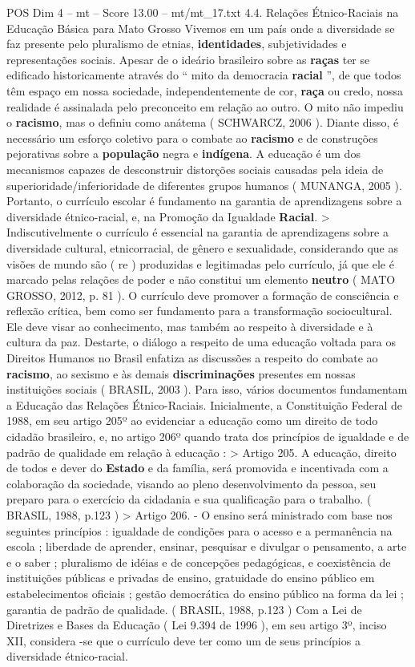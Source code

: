 \begin{textsample}{POS Dim 4 – mt – Score 13.00 – mt/mt\_17.txt}  \label{ex:f4_pos_174}
4.4.
Relações Étnico-Raciais na Educação Básica para Mato Grosso Vivemos em um país onde a diversidade se faz presente pelo pluralismo de etnias, \textbf{identidades}, subjetividades e representações sociais.
Apesar de o ideário brasileiro sobre as \textbf{raças} ter se edificado historicamente através do “ mito da democracia \textbf{racial} ”, de que todos têm espaço em nossa sociedade, independentemente de cor, \textbf{raça} ou credo, nossa realidade é assinalada pelo preconceito em relação ao outro.
O mito não impediu o \textbf{racismo}, mas o definiu como anátema ( SCHWARCZ, 2006 ).
Diante disso, é necessário um esforço coletivo para o combate ao \textbf{racismo} e de construções pejorativas sobre a \textbf{população} negra e \textbf{indígena}.
A educação é um dos mecanismos capazes de desconstruir distorções sociais causadas pela ideia de superioridade/inferioridade de diferentes grupos humanos ( MUNANGA, 2005 ).
Portanto, o currículo escolar é fundamento na garantia de aprendizagens sobre a diversidade étnico-racial, e, na Promoção da Igualdade \textbf{Racial}. > Indiscutivelmente o currículo é essencial na garantia de aprendizagens sobre a diversidade cultural, etnicorracial, de gênero e sexualidade, considerando que as visões de mundo são ( re ) produzidas e legitimadas pelo currículo, já que ele é marcado pelas relações de poder e não constitui um elemento \textbf{neutro} ( MATO GROSSO, 2012, p. 81 ).
O currículo deve promover a formação de consciência e reflexão crítica, bem como ser fundamento para a transformação sociocultural.
Ele deve visar ao conhecimento, mas também ao respeito à diversidade e à cultura da paz.
Destarte, o diálogo a respeito de uma educação voltada para os Direitos Humanos no Brasil enfatiza as discussões a respeito do combate ao \textbf{racismo}, ao sexismo e às demais \textbf{discriminações} presentes em nossas instituições sociais ( BRASIL, 2003 ).
Para isso, vários documentos fundamentam a Educação das Relações Étnico-Raciais.
Inicialmente, a Constituição Federal de 1988, em seu artigo 205º ao evidenciar a educação como um direito de todo cidadão brasileiro, e, no artigo 206º quando trata dos princípios de igualdade e de padrão de qualidade em relação à educação : > Artigo 205.
A educação, direito de todos e dever do \textbf{Estado} e da família, será promovida e incentivada com a colaboração da sociedade, visando ao pleno desenvolvimento da pessoa, seu preparo para o exercício da cidadania e sua qualificação para o trabalho. ( BRASIL, 1988, p.123 ) > Artigo 206. - O ensino será ministrado com base nos seguintes princípios : igualdade de condições para o acesso e a permanência na escola ; liberdade de aprender, ensinar, pesquisar e divulgar o pensamento, a arte e o saber ; pluralismo de idéias e de concepções pedagógicas, e coexistência de instituições públicas e privadas de ensino, gratuidade do ensino público em estabelecimentos oficiais ; gestão democrática do ensino público na forma da lei ; garantia de padrão de qualidade. ( BRASIL, 1988, p.123 ) Com a Lei de Diretrizes e Bases da Educação ( Lei 9.394 de 1996 ), em seu artigo 3º, inciso XII, considera -se que o currículo deve ter como um de seus princípios a diversidade étnico-racial.

\end{textsample}
